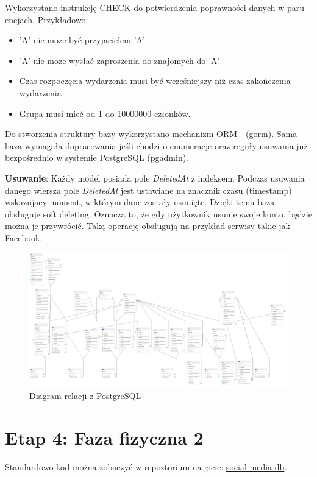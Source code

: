 \documentclass{article}
\begin{document}
Wykorzystano instrukcję CHECK do potwierdzenia poprawności danych w paru encjach. Przykładowo:
\begin{itemize}
    \item 'A' nie moze być przyjacielem 'A'
    \item 'A' nie moze wysłać zaproszenia do znajomych do 'A'
    \item Czas rozpoczęcia wydarzenia musi być wcześniejszy niż czas zakończenia wydarzenia
    \item Grupa musi mieć od 1 do 10000000 członków.
\end{itemize}

Do stworzenia struktury bazy wykorzystano mechanizm ORM - (\href{https://gorm.io/}{gorm}). Sama baza wymagała dopracowania jeśli chodzi o enumeracje oraz reguły usuwania już bezpośrednio w systemie PostgreSQL (pgadmin). 

\textbf{Usuwanie}: Każdy model posiada pole \textit{DeletedAt} z indeksem. Podczas usuwania danego wiersza pole \textit{DeletedAt} jest ustawiane na znacznik czasu (timestamp) wskazujący moment, w którym dane zostały usunięte. Dzięki temu baza obsługuje soft deleting. Oznacza to, że gdy użytkownik usunie swoje konto, będzie można je przywrócić. Taką operację obsługują na przykład serwisy takie jak Facebook.

\begin{figure}[H]
    \centering
    \includegraphics[width=\linewidth]{images/postgres_diagram.png}
    \caption{Diagram relacji z PostgreSQL}
    \label{fig:postgres}
\end{figure}


\section{Etap 4: Faza fizyczna 2}

\quad Standardowo kod można zobaczyć w repoztorium na gicie: \href{https://github.com/lukaszfabia/social_media_db}{social media db}. \\
\end{document}
